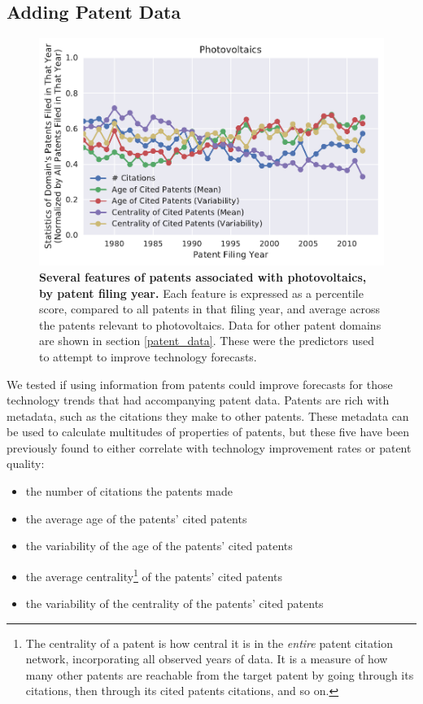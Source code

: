 \documentclass{article}
\begin{document}
\subsection{Adding Patent Data}
\begin{figure}
    \centering
    \includegraphics[width=.75\textwidth]{figs/Patent_Data_SOLAR_PV.pdf}
    \caption{\textbf{Several features of patents associated with photovoltaics, by patent filing year.} Each feature is expressed as a percentile score, compared to all patents in that filing year, and average across the patents relevant to photovoltaics. Data for other patent domains are shown in section \ref{patent_data}. These were the predictors used to attempt to improve technology forecasts.}
    \label{Patent_Data_Example}
\end{figure}

We tested if using information from patents could improve forecasts for those technology trends that had accompanying patent data. %
Patents are rich with metadata, such as the citations they make to other patents. These metadata can be used to calculate multitudes of properties of patents, but these five have been previously found to either correlate with technology improvement rates or patent quality:

\begin{itemize}
    \item the number of citations the patents made
    \item the average age of the patents' cited patents
    \item the variability of the age of the patents' cited patents
    \item the average centrality\footnote{The centrality of a patent is how central it is in the \textit{entire} patent citation network, incorporating all observed years of data. It is a measure of how many other patents are reachable from the target patent by going through its citations, then through its cited patents citations, and so on.} of the patents' cited patents
    \item the variability of the centrality of the patents' cited patents
\end{itemize}
\end{document}
